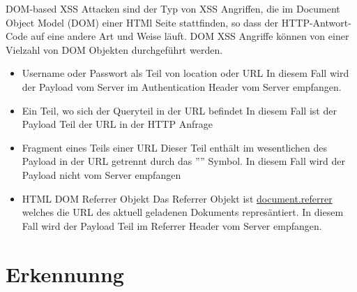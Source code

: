 DOM-based XSS Attacken sind der Typ von XSS Angriffen, die im Document Object Model (DOM) einer HTMl Seite stattfinden, so dass der HTTP-Antwort-Code auf eine andere Art und Weise läuft. DOM XSS Angriffe können von einer Vielzahl von DOM Objekten durchgeführt werden. \autocite[763]{swaswatigoswami2017}

\begin{itemize}
	\item Username oder Passwort als Teil von location oder URL \newline In diesem Fall wird der Payload vom Server im Authentication Header vom Server empfangen.
	\item Ein Teil, wo sich der Queryteil in der URL befindet \newline In diesem Fall ist der Payload Teil der URL in der HTTP Anfrage
	\item Fragment eines Teils einer URL \newline Dieser Teil enthält im wesentlichen des Payload in der URL getrennt durch das ''\text{\#}'' Symbol. In diesem Fall wird der Payload nicht vom Server empfangen
	\item HTML DOM Referrer Objekt \newline Das Referrer Objekt ist \url{document.referrer} welches die URL des aktuell geladenen Dokuments represäntiert. In diesem Fall wird der Payload Teil im Referrer Header vom Server empfangen.
\end{itemize}


\section{Erkennunng}
\label{section:Detection}

